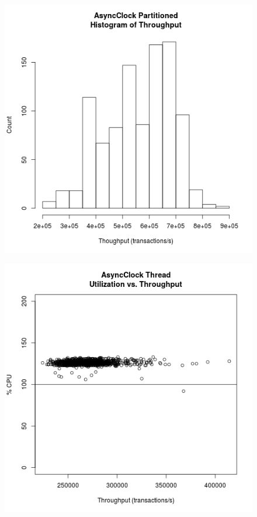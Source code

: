 \begin{figure}
\center
\includegraphics[height=.25\textheight]{async_partitioned_throughput_hist.png}
\caption{\label{async_partitioned_throughput}}
\end{figure}

\clearpage

\begin{figure}
\center
\includegraphics[height=.25\textheight]{async_thread_throughput_utilization.png}
\caption{\label{async_thread_throughput_utilization}}
\end{figure}

